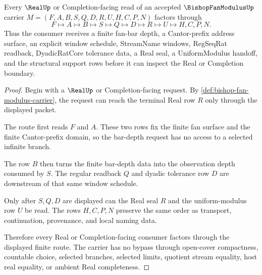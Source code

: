 \begin{theorem}
\label{thm:bishop-fan-modulus-real-window-handoff}
Every $\RealUp$ or Completion-facing read of an accepted $\BishopFanModulusUp$ carrier $M=(F,A,B,S,Q,D,R,U,H,C,P,N)$ factors through
$$
F \longmapsto A \longmapsto B \longmapsto S \longmapsto Q \longmapsto D \longmapsto R \longmapsto U \longmapsto H,C,P,N .
$$
Thus the consumer receives a finite fan-bar depth, a Cantor-prefix address surface, an explicit window schedule, StreamName windows, RegSeqRat readback, DyadicRatCore tolerance data, a Real seal, a UniformModulus handoff, and the structural support rows before it can inspect the Real or Completion boundary.
\end{theorem}
\begin{proof}
Begin with a $\RealUp$ or Completion-facing request. By \autoref{def:bishop-fan-modulus-carrier}, the request can reach the terminal Real row $R$ only through the displayed packet.

The route first reads $F$ and $A$. These two rows fix the finite fan surface and the finite Cantor-prefix domain, so the bar-depth request has no access to a selected infinite branch.

The row $B$ then turns the finite bar-depth data into the observation depth consumed by $S$. The regular readback $Q$ and dyadic tolerance row $D$ are downstream of that same window schedule.

Only after $S,Q,D$ are displayed can the Real seal $R$ and the uniform-modulus row $U$ be read. The rows $H,C,P,N$ preserve the same order as transport, continuation, provenance, and local naming data.

Therefore every Real or Completion-facing consumer factors through the displayed finite route. The carrier has no bypass through open-cover compactness, countable choice, selected branches, selected limits, quotient stream equality, host real equality, or ambient Real completeness.
\end{proof}

